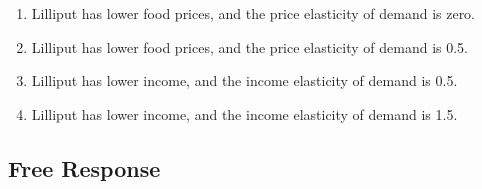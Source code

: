 \documentclass{article}
\begin{document}
\begin{enumerate}
	\begin{enumerate}
	
	\item Lilliput has lower food prices, and the price elasticity of demand is zero.
	
	\item Lilliput has lower food prices, and the price elasticity of demand is 0.5. 
	
	\item Lilliput has lower income, and the income elasticity of demand is 0.5.
	
	\item Lilliput has lower income, and the income elasticity of demand is 1.5.
	
	\end{enumerate}

\end{enumerate}

\subsection*{Free Response}
\end{document}
